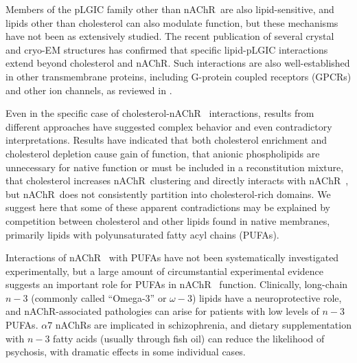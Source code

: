 \documentclass[final,3p,times,twocolumn]{elsarticle}
\newcommand{\nachr}{nAChR}
\begin{document}
Members of the pLGIC family other than \nachr~are also lipid-sensitive,\cite{Dunn1989,Sooksawate2001,Baenziger2011, Dostalova2014} and lipids other than cholesterol can also modulate function\cite{Bhushan1993,Cheng2007,Corrie2002a,DaCosta2002,Rankin1997,Wenz2005,Hamouda2006a}, but these mechanisms have not been as extensively studied.  The recent publication of several crystal and cryo-EM structures \cite{Basak2017,Althoff2014,Laverty2017,Zhu2018}
has confirmed that specific lipid-pLGIC interactions extend beyond cholesterol and \nachr.  Such interactions are also well-established in other transmembrane proteins, including G-protein coupled receptors (GPCRs) and other ion channels, as reviewed in \cite{Burger2000, Lee2004, Pucadyil2006a, Landreh2016, Smithers2012}. 

Even in the specific case of cholesterol-\nachr~ interactions, results from different approaches have suggested complex behavior and even contradictory interpretations.  Results have indicated that both cholesterol enrichment\cite{Dalziel1980,Criado1982,Ochoa1983} and cholesterol depletion\cite{Santiago2001} cause gain of function, that anionic phospholipids are unnecessary for native function\cite{Dalziel1980,Criado1982,Ochoa1983} or must be\cite{Corrie2002a,DaCosta2002} included in a reconstitution mixture,  that cholesterol increases \nachr~clustering\cite{Pato2008, Zhu2006, Barrantes2007} and directly interacts with \nachr~\cite{Leibel1987,Jones1988}, but \nachr~does not consistently partition into cholesterol-rich domains\cite{Bermdez_Partition_2010}. We suggest here that some of these apparent contradictions may be explained by competition between cholesterol and other lipids found in native membranes, primarily lipids with polyunsaturated fatty acyl chains (PUFAs).   

Interactions of \nachr~ with PUFAs have not been systematically investigated experimentally, but a large amount of circumstantial experimental evidence suggests an important role for PUFAs in \nachr~ function.    Clinically, long-chain $n-3$  (commonly called ``Omega-3'' or $\omega-3$) lipids have a neuroprotective role\cite{Piomelli2007}, and \nachr-associated pathologies can arise for patients with low levels of $n-3$ PUFAs. $\alpha7$ \nachr s are implicated in schizophrenia\cite{Haydar2010}, and dietary supplementation with $n-3$ fatty acids (usually through fish oil) can reduce the likelihood of psychosis, with dramatic effects in some individual cases.\cite{Amminger2010}   
\end{document}
